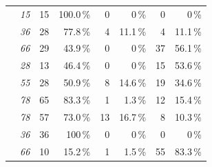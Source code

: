 {{\begin{table}
\begin{tabular}{p{1.1cm}rrrrrrr}
	\jumper & \textit{15} &
	\cellcolor{lt-color!100!white}15 & \cellcolor{lt-color!100!white}100.0\,\% & 
	0 & 0\,\% & 
	0 & 0\,\%\\
	
	\kanzi & \textit{36} &
	\cellcolor{lt-color!78!white}28 & \cellcolor{lt-color!78!white}77.8\,\% & 
	\cellcolor{xmt-color!11!white}	4& \cellcolor{xmt-color!11!white}11.1\,\% & 
	\cellcolor{nmt-color!11!white}4 & \cellcolor{nmt-color!11!white}11.1\,\%\\
	
	\dconvert & \textit{66} &
	\cellcolor{lt-color!43!white}29 & \cellcolor{lt-color!43!white}43.9\,\% & 
	0 & 0\,\% & 
	\cellcolor{nmt-color!56!white}37 & \cellcolor{nmt-color!56!white}56.1\,\%\\
	
	\htwo & \textit{28} &
	\cellcolor{lt-color!47!white}13 & \cellcolor{lt-color!47!white}46.4\,\% & 
	0 & 0\,\% & 
	\cellcolor{nmt-color!53!white}15 & \cellcolor{nmt-color!53!white}53.6\,\%\\
	
	\batik & \textit{55} &
	\cellcolor{lt-color!50!white}28 & \cellcolor{lt-color!50!white}50.9\,\% & 
	\cellcolor{xmt-color!14!white}8 & \cellcolor{xmt-color!14!white}14.6\,\% & 
	\cellcolor{nmt-color!34!white}19 & \cellcolor{nmt-color!34!white}34.6\,\%\\
	
	\midrule
	
		\xz & \textit{78} &
	\cellcolor{lt-color!83!white}65 & \cellcolor{lt-color!83!white}83.3\,\% & 
	\cellcolor{xmt-color!1!white}1 & \cellcolor{xmt-color!1!white}1.3\,\% & 
	\cellcolor{nmt-color!15!white}12 & \cellcolor{nmt-color!16!white}15.4\,\%\\
	
		\lrzip & \textit{78} &
	\cellcolor{lt-color!73!white}57 & \cellcolor{lt-color!73!white}73.0\,\% & 
	\cellcolor{xmt-color!16!white}13 & \cellcolor{xmt-color!16!white}16.7\,\% & 
	\cellcolor{nmt-color!10!white}8 & \cellcolor{nmt-color!10!white}10.3\,\%\\
	
	\xzwo & \textit{36} &
	\cellcolor{lt-color!100!white}36 & \cellcolor{lt-color!100!white}100\,\% & 
	0 & 0\,\% & 
	0 & 0\,\%\\
	
	\zdrei & \textit{66} &
	\cellcolor{lt-color!15!white}10 & \cellcolor{lt-color!15!white}15.2\,\% & 
	\cellcolor{xmt-color!2!white}1 & \cellcolor{xmt-color!2!white}1.5\,\% & 
	\cellcolor{nmt-color!83!white}55 & \cellcolor{nmt-color!83!white}83.3\,\%\\
	

\end{tabular}
\end{table}}}
